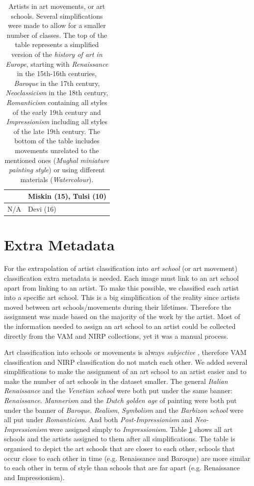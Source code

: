 \documentclass[11pt,a4paper,twoside,openright]{report}
\begin{document}
\begin{table}[htp]
\begin{tabular}{|l|l|}
                     &  Miskin (15), Tulsi (10)                         \\
\midrule
N/A                  &  Devi (16) \\
\bottomrule
\end{tabular}
\caption[Artists in art movements]{Artists in art movements, or art schools.
Several simplifications were made to allow for a smaller number of classes.
The top of the table represents a simplified version of the \emph{history of
art in Europe}, starting with \emph{Renaissance} in the 15th-16th centuries,
\emph{Baroque} in the 17th century, \emph{Neoclassicism} in the 18th century,
\emph{Romanticism} containing all styles of the early 19th century and
\emph{Impressionism} including all styles of the late 19th century.  The bottom
of the table includes movements unrelated to the mentioned ones (\emph{Mughal
miniature painting style}) or using different materials (\emph{Watercolour}).}
\label{tab:style}
\end{table}

\section{Extra Metadata}

For the extrapolation of artist classification into \emph{art school} (or art
movement) classification extra metadata is needed.  Each image must link to an
art school apart from linking to an artist.  To make this possible, we
classified each artist into a specific art school.  This is a big
simplification of the reality since artists moved between art schools/movements
during their lifetimes.  Therefore the assignment was made based on the
majority of the work by the artist.  Most of the information needed to assign
an art school to an artist could be collected directly from the VAM and NIRP
collections, yet it was a manual process.

Art classification into schools or movements is always \emph{subjective}
\cite{dimaggio87art}, therefore VAM classification and NIRP classification do
not match each other.  We added several simplifications to make the assignment
of an art school to an artist easier and to make the number of art schools in
the dataset smaller.  The general \emph{Italian Renaissance} and the
\emph{Venetian school} were both put under the same banner: \emph{Renaissance}.
\emph{Mannerism} and the \emph{Dutch golden age} of painting were both put
under the banner of \emph{Baroque}.  \emph{Realism}, \emph{Symbolism} and the
\emph{Barbizon school} were all put under \emph{Romanticism}.  And both
\emph{Post-Impressionism} and \emph{Neo-Impressionism} were assigned simply to
\emph{Impressionism}.  Table \ref{tab:style} shows all art schools and the
artists assigned to them after all simplifications.  The table is organised to
depict the art schools that are closer to each other, schools that occur close
to each other in time (e.g. Renaissance and Baroque) are more similar to each
other in term of style than schools that are far apart (e.g. Renaissance and
Impressionism).
\end{document}
